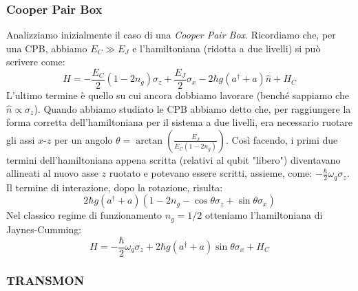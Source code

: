\subsubsection{Cooper Pair Box}
Analizziamo inizialmente il caso di una \textit{Cooper Pair Box}.
Ricordiamo che, per una CPB, abbiamo $E_C \gg E_J$ e l'hamiltoniana (ridotta a due livelli) si può scrivere come:
\begin{equation*}
    H = -\frac{E_C}{2}(1-2n_g)\sigma_z + \frac{E_J}{2}\sigma_x - 2 \hbar g (a^\dagger + a )\hat n+H_C
\end{equation*}
L'ultimo termine è quello su cui ancora dobbiamo lavorare (benché sappiamo che $\hat n \propto \sigma_z$).
Quando abbiamo studiato le CPB abbiamo detto che, per raggiungere la forma corretta dell'hamiltoniana per il sistema a due livelli, era necessario ruotare gli assi $x$-$z$ per un angolo $\theta=\arctan\left( \frac{E_J}{E_C(1-2n_g)}\right)$. Così facendo, i primi due termini dell'hamiltoniana appena scritta (relativi al qubit "libero") diventavano allineati al nuovo asse $z$ ruotato e potevano essere scritti, assieme, come: $-\frac{\hbar}{2}\omega_q \sigma_z$.
Il termine di interazione, dopo la rotazione, risulta:
\begin{equation*}
    2\hbar g (a^\dagger +a) (1 - 2n_g - \cos \theta \sigma_z + \sin \theta \sigma_x)
\end{equation*}
Nel classico regime di funzionamento $n_g=1/2$ otteniamo l'hamiltoniana di Jaynes-Cumming:
\begin{equation*}
    H=-\frac{\hbar}{2}\omega_q \sigma_z + 2\hbar g (a^\dagger + a)\sin \theta \sigma_x + H_C
\end{equation*}

\subsubsection{TRANSMON}

